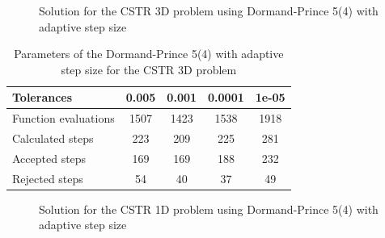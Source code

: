 \begin{figure}[H]
    \centering
    \caption{Solution for the CSTR 3D problem using Dormand-Prince 5(4) with adaptive step size}
    \label{7_5_3D_tols}
\end{figure}

\begin{table}[H]
    \centering
    \begin{tabular}{@{}l|cccc@{}}
    \toprule
    Tolerances           & 0.005 & 0.001 & 0.0001 & 1e-05 \\ \midrule
    Function evaluations & 1507  & 1423  & 1538   & 1918  \\
    Calculated steps     & 223   & 209   & 225    & 281   \\
    Accepted steps       & 169   & 169   & 188    & 232   \\
    Rejected steps       & 54    & 40    & 37     & 49    \\ \bottomrule
    \end{tabular}
    \caption{Parameters of the Dormand-Prince 5(4) with adaptive step size for the CSTR 3D problem}
    \label{7_5_3D_tols_table}
\end{table}

\begin{figure}[H]
    \centering
    \caption{Solution for the CSTR 1D problem using Dormand-Prince 5(4) with adaptive step size}
    \label{7_5_1D_tols}
\end{figure}

